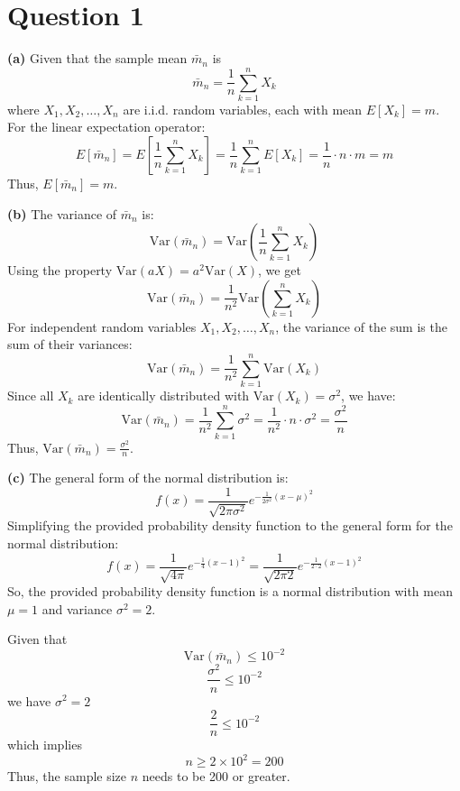 \documentclass{article}
\date{November 2024}
\begin{document}
\maketitle

\section{Question 1}
\textbf{(a)} Given that the sample mean \(\bar{m}_n\) is
\[
\bar{m}_n = \frac{1}{n} \sum_{k=1}^{n} X_k
\]
where \(X_1, X_2, \dots, X_n\) are i.i.d. random variables, each with mean \(E[X_k] = m\). 
For the linear expectation operator:
\[
E[\bar{m}_n] = E\left[\frac{1}{n} \sum_{k=1}^{n} X_k\right] = \frac{1}{n} \sum_{k=1}^{n} E[X_k] = \frac{1}{n} \cdot n \cdot m = m
\]
Thus, \(E[\bar{m}_n] = m\).

\vspace{1em} %

\textbf{(b)} The variance of \(\bar{m}_n\) is:
\[
\text{Var}(\bar{m}_n) = \text{Var}\left(\frac{1}{n} \sum_{k=1}^{n} X_k\right)
\]
Using the property \(\text{Var}(aX) = a^2 \text{Var}(X)\), we get
\[
\text{Var}(\bar{m}_n) = \frac{1}{n^2} \text{Var}\left(\sum_{k=1}^{n} X_k\right)
\]
For independent random variables \(X_1, X_2, \dots, X_n\), the variance of the sum is the sum of their variances:
\[
\text{Var}(\bar{m}_n) = \frac{1}{n^2} \sum_{k=1}^{n} \text{Var}(X_k)
\]
Since all \(X_k\) are identically distributed with \(\text{Var}(X_k) = \sigma^2\), we have:
\[
\text{Var}(\bar{m}_n) = \frac{1}{n^2} \sum_{k=1}^{n} \sigma^2 = \frac{1}{n^2} \cdot n \cdot \sigma^2 = \frac{\sigma^2}{n}
\]
Thus, \(\text{Var}(\bar{m}_n) = \frac{\sigma^2}{n}\).

\vspace{1em} %

\textbf{(c)} The general form of the normal distribution is:
\[
f(x) = \frac{1}{\sqrt{2 \pi \sigma^2}} e^{-\frac{1}{2 \sigma^2} (x - \mu)^2}
\]
Simplifying the provided probability density function to the general form for the normal distribution:
\[
f(x) = \frac{1}{\sqrt{4 \pi}} e^{-\frac{1}{4} (x - 1)^2} = \frac{1}{\sqrt{2 \pi 2}} e^{-\frac{1}{2 \cdot 2} (x - 1)^2}
\]
So, the provided probability density function is a normal distribution with mean \(\mu = 1\) and variance \(\sigma^2 = 2\).

Given that
\[
\text{Var}(\bar{m}_n) \leq 10^{-2}
\]
\[
\frac{\sigma^2}{n} \leq 10^{-2}
\]
we have ${\sigma^2 =2}$
\[
\frac{2}{n} \leq 10^{-2}
\]
which implies
\[
n \geq 2 \times 10^2 = 200
\]
Thus, the sample size \(n\) needs to be 200 or greater.
\end{document}
